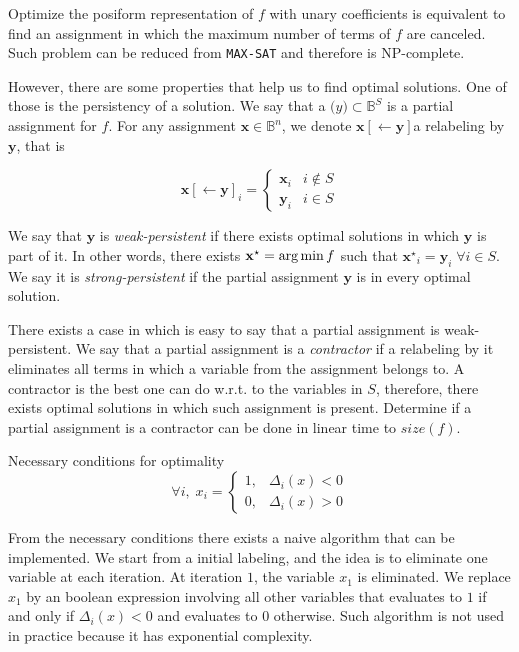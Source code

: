 Optimize the posiform representation of $f$ with unary coefficients is equivalent to find an assignment in which the maximum number of terms of $f$ are canceled. Such problem can be reduced from \texttt{MAX-SAT} and therefore is NP-complete.

However, there are some properties that help us to find optimal solutions. One of those is the persistency of a solution. We say that a $\mathbf(y) \subset \mathbb{B}^S$ is a partial assignment for $f$. For any assignment $\mathbf{x} \in \mathbb{B}^n$, we denote $\mathbf{x}[\leftarrow \mathbf{y}] $a relabeling by $\mathbf{y}$, that is

\[
	\mathbf{x}[\leftarrow \mathbf{y}]_i = \left\{ 
	\begin{array}{ll}
		\mathbf{x}_i & i \notin S\\
		\mathbf{y}_i & i \in S
	\end{array}\right.
\]

 We say that $\mathbf{y}$ is \emph{weak-persistent} if there exists optimal solutions in which $\mathbf{y}$ is part of it. In other words, there exists $\mathbf{x^\star}=\operatorname*{arg\,min} f$ such that $\mathbf{x^\star}_i = \mathbf{y}_i \; \forall i \in S$. We say it is \emph{strong-persistent} if the partial assignment $\mathbf{y}$ is in every optimal solution.
 
 
There exists a case in which is easy to say that a partial assignment is weak-persistent. We say that a partial assignment is a \emph{contractor} if a relabeling by it eliminates all terms in which a variable from the assignment belongs to. A contractor is the best one can do w.r.t. to the variables in $S$, therefore, there exists optimal solutions in which such assignment is present. Determine if a partial assignment is a contractor can be done in linear time to $size(f)$.

\begin{proposition}{Necessary conditions for optimality}
	\[
		\forall i, \;	x_i = \left\{ \begin{array}{ll}
			1, & \Delta_i(x) < 0 \\
			0, & \Delta_i(x) > 0
		\end{array}\right.
	\]
\end{proposition}

From the necessary conditions there exists a naive algorithm that can be implemented. We start from a initial labeling, and the idea is to eliminate one variable at each iteration. At iteration $1$, the variable $x_1$ is eliminated. We replace $x_1$ by an boolean expression involving all other variables that evaluates to $1$ if and only if $\Delta_i(x)<0$ and evaluates to $0$ otherwise. Such algorithm is not used in practice because it has exponential complexity.

